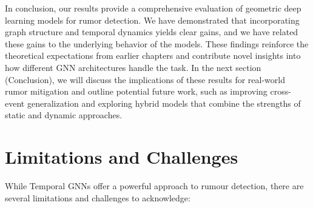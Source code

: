 \documentclass{cshonours}
\begin{document}
In conclusion, our results provide a comprehensive evaluation of geometric deep learning models for rumor detection. We have demonstrated that incorporating graph structure and temporal dynamics yields clear gains, and we have related these gains to the underlying behavior of the models. These findings reinforce the theoretical expectations from earlier chapters and contribute novel insights into how different GNN architectures handle the task. In the next section (Conclusion), we will discuss the implications of these results for real-world rumor mitigation and outline potential future work, such as improving cross-event generalization and exploring hybrid models that combine the strengths of static and dynamic approaches.



\chapter{Limitations and Challenges}

While Temporal GNNs offer a powerful approach to rumour detection, there are several limitations and challenges to acknowledge:
\end{document}
